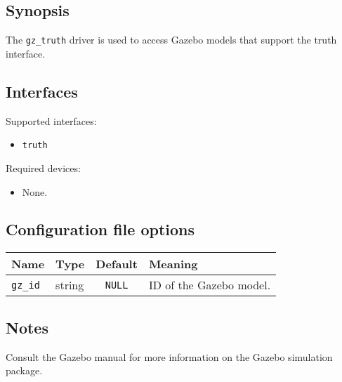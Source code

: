 \subsection*{Synopsis}

The {\tt gz\_truth} driver is used to access Gazebo models that
support the truth interface.

\subsection*{Interfaces}

\noindent Supported interfaces:
\begin{itemize}
\item {\tt truth}
\end{itemize}

\noindent Required devices:
\begin{itemize}
\item None.
\end{itemize}



\subsection*{Configuration file options}

\begin{center}
{\small \begin{tabularx}{\columnwidth}{|l|l|c|X|}
\hline
Name & Type & Default & Meaning\\
\hline
{\tt gz\_id} & string & {\tt NULL} & ID of the Gazebo model. \\
\hline
\end{tabularx}}
\end{center}

\subsection*{Notes}

Consult the Gazebo manual for more information on the Gazebo
simulation package.

